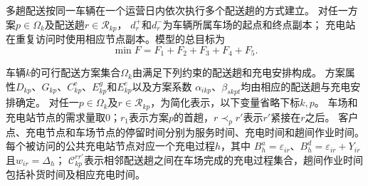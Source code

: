 多趟配送按同一车辆在一个运营日内依次执行多个配送趟的方式建立\cite{ref:44}。
对任一方案$p\in\Omega_k$及配送趟$r\in\mathcal R_{kp}$，
$d_r^{+}$和$d_r^{-}$为车辆所属车场的起点和终点副本；
充电站在重复访问时使用相应节点副本。模型的总目标为
\begin{equation}
\min F=F_1+F_2+F_3+F_4+F_5.
\label{eq:unified-objective}
\end{equation}

车辆$k$的可行配送方案集合$\Omega_k$由满足下列约束的配送趟和充电安排构成。
方案属性$D_{kp}$、$G_{kp}$、$C_{kp}^{\mathrm e}$、$E_{kp}^{g}$和$E_{kp}^{e}$以及方案系数
$\alpha_{ikp}$、$\beta_{skpt}$均由相应的配送趟与充电安排确定。
对任一$p\in\Omega_k$及$r\in\mathcal R_{kp}$，为简化表示，以下变量省略下标$k,p$。
车场和充电站节点的需求量取0；$r_1$表示方案$p$的首趟，$r\prec_p r'$表示$r'$紧接在$r$之后。
客户点、充电节点和车场节点的停留时间分别为服务时间、充电时间和趟间作业时间。
每个被访问的公共充电站节点对应一个充电过程$h$，其中
$B_h^{a}=\varepsilon_{ir}$、$B_h^{d}=\varepsilon_{ir}+Y_{ir}$且$w_{ir}=\Delta_h$；
$\mathcal C_{kp}^{rr'}$表示相邻配送趟之间在车场完成的充电过程集合，趟间作业时间包括补货时间及相应充电时间。


